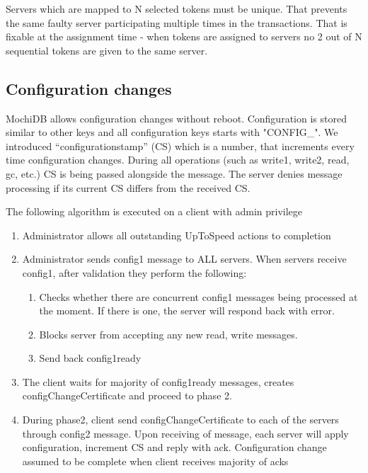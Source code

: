 \documentclass[letterpaper,twocolumn,10pt]{article}
\begin{document}
Servers which are mapped to N selected tokens must be unique. That prevents the same faulty server participating multiple times in the transactions. That is fixable at the assignment time - when tokens are assigned to servers no 2 out of N sequential tokens are given to the same server.

\subsection{Configuration changes}
MochiDB allows configuration changes without reboot. Configuration is stored similar to other keys and all configuration keys starts with "CONFIG\_". We introduced “configurationstamp” (CS) which is a number, that increments every time configuration changes. During all operations (such as write1, write2, read, gc, etc.) CS is being passed alongside the message. The server denies message processing if its current CS differs from the received CS.

The following algorithm is executed on a client with admin privilege
\begin{enumerate}[noitemsep, topsep=0pt,]
\item Administrator allows all outstanding {UpToSpeed} actions to completion
\item Administrator sends config1 message to ALL servers. When servers receive config1, after validation they perform the following:
 \begin{enumerate}[noitemsep, topsep=0pt,]
    \item Checks whether there are concurrent config1 messages being processed at the moment. If there is one, the server will respond back with error. 
    \item Blocks server from accepting any new read, write messages.
    \item Send back config1ready
\end{enumerate}
\item The client waits for majority of config1ready messages, creates configChangeCertificate and proceed to phase 2.
\item During phase2, client send configChangeCertificate to each of the servers through config2 message. Upon receiving of message, each server will apply configuration, increment CS and reply with ack.
Configuration change assumed to be complete when client receives majority of acks
\end{enumerate}
\end{document}
